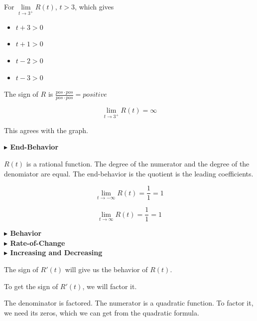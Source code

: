 \documentclass{ximera}
\begin{document}
\begin{explanation}
For $\lim\limits_{t \to 3^+}R(t)$,  $t > 3$, which gives

\begin{itemize}
\item $t + 3 > 0$
\item $t + 1 > 0$
\item $t - 2 > 0$
\item $t - 3 > 0$
\end{itemize}


The sign of $R$ is $\frac{pos \cdot pos}{pos \cdot pos} = positive$ 



\[
\lim\limits_{t \to 3^+}R(t) = \infty
\]








\end{explanation}



This agrees with the graph.






\textbf{\textcolor{blue!55!black}{$\blacktriangleright$ End-Behavior}} 

$R(t)$ is a rational function. The degree of the numerator and the degree of the denomiator are equal.  The end-behavior is the quotient is the leading coefficients.



\[  
\lim\limits_{t \to -\infty}R(t) = \frac{1}{1} = 1
\]




\[  
\lim\limits_{t \to \infty}R(t) = \frac{1}{1} = 1
\]











\textbf{\textcolor{blue!55!black}{$\blacktriangleright$ Behavior}} \\
\textbf{\textcolor{blue!55!black}{$\blacktriangleright$ Rate-of-Change}} \\
\textbf{\textcolor{blue!55!black}{$\blacktriangleright$ Increasing and Decreasing}} 



The sign of $R'(t)$ will give us the behavior of $R(t)$. 

To get the sign of $R'(t)$, we will factor it. 

The denominator is factored.  The numerator is a quadratic function.  To factor it, we need its zeros, which we can get from the quadratic formula. 
\end{document}

